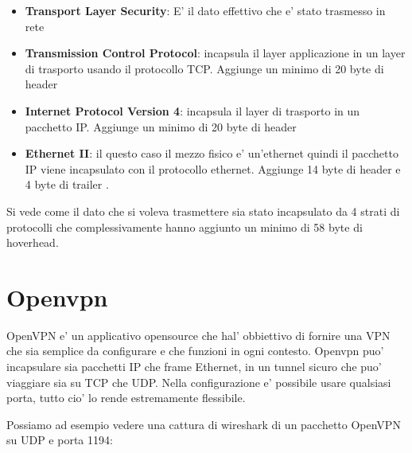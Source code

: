 \begin{itemize}
    \item \textbf{Transport Layer Security}\cite{RFC_8446}: E' il dato effettivo che e' stato trasmesso in rete  
    
    \item \textbf{Transmission Control Protocol}\cite{RFC_0793}: incapsula il layer applicazione in un layer di trasporto usando il protocollo TCP. Aggiunge un minimo di 20 byte di header 
    
    \item \textbf{Internet Protocol Version 4}\cite{RFC_0791}: incapsula il layer di trasporto in un pacchetto IP. Aggiunge un minimo di 20 byte di header 
    
    \item \textbf{Ethernet II}\cite{ethernet-ii}: il questo caso il mezzo fisico e' un'ethernet quindi il pacchetto IP viene incapsulato con il protocollo ethernet. Aggiunge 14 byte di header e 4 byte di trailer .
\end{itemize}

Si vede come il dato che si voleva trasmettere sia stato incapsulato da 4 strati di protocolli che complessivamente hanno aggiunto un minimo di 58 byte di hoverhead.


\section{Openvpn}



OpenVPN e' un applicativo opensource che hal' obbiettivo di fornire una VPN che sia semplice da configurare e che funzioni in ogni contesto. Openvpn puo' incapsulare sia pacchetti IP che frame Ethernet, in un tunnel sicuro che puo' viaggiare sia su TCP che UDP. Nella configurazione e' possibile usare qualsiasi porta, tutto cio' lo rende estremamente flessibile.

Possiamo ad esempio vedere una cattura di wireshark di un pacchetto OpenVPN su UDP e porta 1194:

